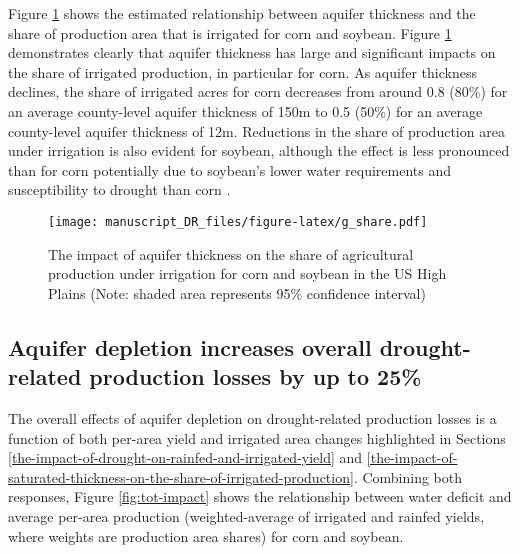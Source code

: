 \documentclass[
]{article}
\begin{document}
Figure \ref{fig:ir-share} shows the estimated relationship between aquifer thickness and the share of production area that is irrigated for corn and soybean. Figure \ref{fig:ir-share} demonstrates clearly that aquifer thickness has large and significant impacts on the share of irrigated production, in particular for corn. As aquifer thickness declines, the share of irrigated acres for corn decreases from around 0.8 (80\%) for an average county-level aquifer thickness of 150m to 0.5 (50\%) for an average county-level aquifer thickness of 12m. Reductions in the share of production area under irrigation is also evident for soybean, although the effect is less pronounced than for corn potentially due to soybean's lower water requirements and susceptibility to drought than corn \citep{zipper2016drought,ruess2022irrigation}.  

\begin{figure}
{\centering \texttt{[image: manuscript\_DR\_files/figure-latex/g\_share.pdf]} 
}
\caption{The impact of aquifer thickness on the share of agricultural production under irrigation for corn and soybean in the US High Plains (Note: shaded area represents 95\% confidence interval)}\label{fig:ir-share}
\end{figure}

\hypertarget{total-impact-of-decline-in-saturated-thickness}{%
\subsection{Aquifer depletion increases overall drought-related production losses by up to 25\%}\label{total-impact-of-decline-in-saturated-thickness}}

The overall effects of aquifer depletion on drought-related production losses is a function of both per-area yield and irrigated area changes highlighted in Sections \ref{the-impact-of-drought-on-rainfed-and-irrigated-yield} and \ref{the-impact-of-saturated-thickness-on-the-share-of-irrigated-production}. Combining both responses, Figure \ref{fig:tot-impact} shows the relationship between water deficit and average per-area production (weighted-average of irrigated and rainfed yields, where weights are production area shares) for corn and soybean.
\end{document}
